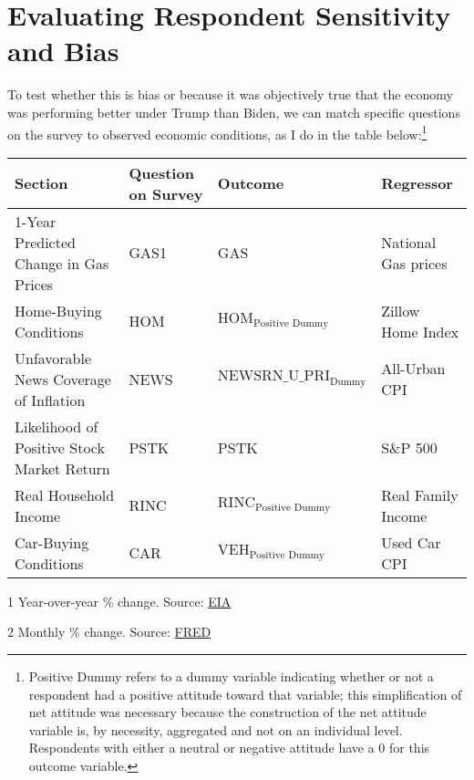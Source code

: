 \documentclass{article}
\begin{document}
\section{Evaluating Respondent Sensitivity and Bias}
To test whether this is bias or because it was objectively true that the economy was performing better under Trump than Biden, we can match specific questions on the survey to observed economic conditions, as I do in the table below:\footnote{Positive Dummy refers to a dummy variable indicating whether or not a respondent had a positive attitude toward that variable; this simplification of net attitude was necessary because the construction of the net attitude variable is, by necessity, aggregated and not on an individual level. Respondents with either a neutral or negative attitude have a 0 for this outcome variable.}
\begin{table}[ht!]
\begin{threeparttable}
\begin{tabular}{|l|l|l|l|}
\hline
\textbf{Section} 							& \textbf{Question on Survey} 	& \textbf{Outcome} 						& \textbf{Regressor} 		\\ \hline
1-Year Predicted Change in Gas Prices		& GAS1					& GAS								&   National Gas prices \tnote{1} \\ \hline
Home-Buying Conditions		     			& HOM      				& $\text{HOM}_\text{Positive Dummy}$		&   Zillow Home Index\tnote{2}	\\ \hline
Unfavorable News Coverage of Inflation    	& NEWS      				& $\text{NEWSRN\_U\_PRI}_\text{Dummy}$  	&   All-Urban CPI\tnote{3}		\\ \hline
Likelihood of Positive Stock Market Return 	& PSTK     				& PSTK								&   S\&P 500\tnote{4}	 \\ \hline
Real Household Income     				& RINC      				& $\text{RINC}_\text{Positive Dummy}$		&   Real Family Income\tnote{5} \\ \hline
Car-Buying Conditions      					& CAR      				& $\text{VEH}_\text{Positive Dummy}$		&   Used Car CPI\tnote{6} \\ \hline
\end{tabular}
\begin{tablenotes} 
\footnotesize
\item[1] Year-over-year \% change. Source: \href{https://www.eia.gov/dnav/pet/hist/LeafHandler.ashx?n=pet&s=emm_epm0_pte_nus_dpg&f=m}{EIA}
\item[2] Monthly \% change. Source: \href{https://fred.stlouisfed.org/series/USAUCSFRCONDOSMSAMID}{FRED} 

\end{tablenotes}
\end{threeparttable}
\end{table}
\end{document}
